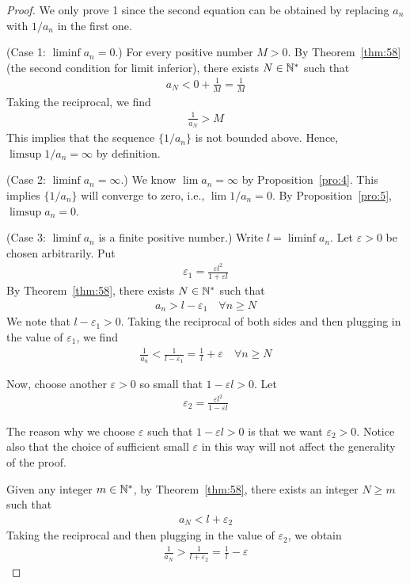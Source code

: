 \documentclass[thmcnt=section, 12pt]{my-elegantbook}
\begin{document}
\begin{proof}
    We only prove 1 since the second equation can be obtained by replacing $a_n$ with $1 / a_n$ in the first one.

    (Case 1: $\liminf a_n = 0$.) For every positive number $M > 0$. By Theorem~\ref{thm:58} (the second condition for limit inferior), there exists $N \in \mathbb{N}^\ast$ such that
    \begin{align*}
        a_N < 0 + \frac{1}{M} = \frac{1}{M}
    \end{align*}
    Taking the reciprocal, we find
    \begin{align*}
        \frac{1}{a_N} > M
    \end{align*}
    This implies that the sequence $\{1 / a_n\}$ is not bounded above. Hence, $\limsup 1 / a_n = \infty$ by definition.

    (Case 2: $\liminf a_n = \infty$.) We know $\lim a_n = \infty$ by Proposition~\ref{pro:4}. This implies $\{1 / a_n\}$ will converge to zero, i.e., $\lim 1 / a_n = 0$. By Proposition~\ref{pro:5}, $\limsup a_n = 0$.

    (Case 3: $\liminf a_n$ is a finite positive number.) Write $l = \liminf a_n$. Let $\varepsilon > 0$ be chosen arbitrarily. Put
    \begin{align*}
        \varepsilon_1 = \frac{\varepsilon l^2}{1 + \varepsilon l}
    \end{align*}
    By Theorem~\ref{thm:58}, there exists $N \in \mathbb{N}^\ast$ such that
    \begin{align*}
        a_n > l - \varepsilon_1
        \quad \forall n \geq N
    \end{align*}
    We note that $l - \varepsilon_1 > 0$. Taking the reciprocal of both sides and then plugging in the value of $\varepsilon_1$, we find
    \begin{align}
        \frac{1}{a_n} < \frac{1}{l - \varepsilon_1}
        = \frac{1}{l} + \varepsilon
        \quad
        \forall n \geq N
        \label{eq:123}
    \end{align}

    Now, choose another $\varepsilon > 0$ so small that $1 - \varepsilon l  > 0$. Let
    \begin{align*}
        \varepsilon_2 = \frac{\varepsilon l^2}{1 - \varepsilon l}
    \end{align*}
    \begin{note}
        The reason why we choose $\varepsilon$ such that $1 - \varepsilon l  > 0$ is that we want $\varepsilon_2 > 0$. Notice also that the choice of sufficient small $\varepsilon$ in this way will not affect the generality of the proof.
    \end{note}
    \noindent Given any integer $m \in \mathbb{N}^\ast$, by Theorem~\ref{thm:58}, there exists an integer $N \geq m$ such that
    \begin{align*}
        a_N < l + \varepsilon_2
    \end{align*}
    Taking the reciprocal and then plugging in the value of $\varepsilon_2$, we obtain
    \begin{align}
        \frac{1}{a_N} > \frac{1}{l + \varepsilon_2}
        = \frac{1}{l} - \varepsilon
        \label{eq:124}
    \end{align}


\end{proof}
\end{document}
